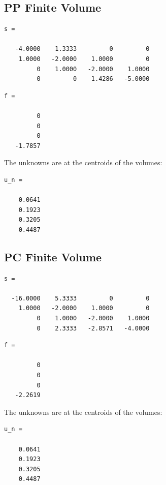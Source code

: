 \documentclass[a4paper,12pt]{article}
\begin{document}
\subsection{PP Finite Volume}
\begin{verbatim}
s =

   -4.0000    1.3333         0         0
    1.0000   -2.0000    1.0000         0
         0    1.0000   -2.0000    1.0000
         0         0    1.4286   -5.0000
\end{verbatim}
\begin{verbatim}
f =

         0
         0
         0
   -1.7857
\end{verbatim}
The unknowns are at the centroids of the volumes:
\begin{verbatim}
u_n =

    0.0641
    0.1923
    0.3205
    0.4487
\end{verbatim}
\subsection{PC Finite Volume}
\begin{verbatim}
s =

  -16.0000    5.3333         0         0
    1.0000   -2.0000    1.0000         0
         0    1.0000   -2.0000    1.0000
         0    2.3333   -2.8571   -4.0000
\end{verbatim}
\begin{verbatim}
f =

         0
         0
         0
   -2.2619
\end{verbatim}
The unknowns are at the centroids of the volumes:
\begin{verbatim}
u_n =

    0.0641
    0.1923
    0.3205
    0.4487
\end{verbatim}
\end{document}
